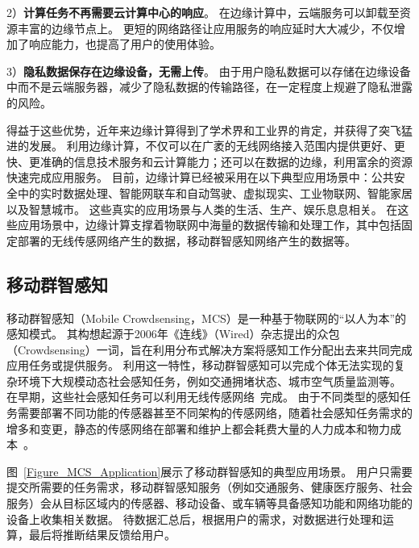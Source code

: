 2）\textbf{计算任务不再需要云计算中心的响应}。
在边缘计算中，云端服务可以卸载至资源丰富的边缘节点上。
更短的网络路径让应用服务的响应延时大大减少，不仅增加了响应能力，也提高了用户的使用体验。

3）\textbf{隐私数据保存在边缘设备，无需上传}。
由于用户隐私数据可以存储在边缘设备中而不是云端服务器，减少了隐私数据的传输路径，在一定程度上规避了隐私泄露的风险。

得益于这些优势，近年来边缘计算得到了学术界和工业界的肯定，并获得了突飞猛进的发展。
利用边缘计算，不仅可以在广袤的无线网络接入范围内提供更好、更快、更准确的信息技术服务和云计算能力；还可以在数据的边缘，利用富余的资源快速完成应用服务。
目前，边缘计算已经被采用在以下典型应用场景中：公共安全中的实时数据处理、智能网联车和自动驾驶、虚拟现实、工业物联网、智能家居以及智慧城市。
这些真实的应用场景与人类的生活、生产、娱乐息息相关。
在这些应用场景中，边缘计算支撑着物联网中海量的数据传输和处理工作，其中包括固定部署的无线传感网络产生的数据，移动群智感知网络产生的数据等。




\subsection{移动群智感知}


移动群智感知（Mobile Crowdsensing，MCS）是一种基于物联网的“以人为本”的感知模式。
其构想起源于2006年《连线》（Wired）杂志提出的众包（Crowdsensing）一词，旨在利用分布式解决方案将感知工作分配出去来共同完成应用任务或提供服务。
利用这一特性，移动群智感知可以完成个体无法实现的复杂环境下大规模动态社会感知任务，例如交通拥堵状态、城市空气质量监测等。
在早期，这些社会感知任务可以利用无线传感网络~\cite{DBLP:journals/cn/AkyildizSSC02}完成。
由于不同类型的感知任务需要部署不同功能的传感器甚至不同架构的传感网络，随着社会感知任务需求的增多和变更，静态的传感网络在部署和维护上都会耗费大量的人力成本和物力成本~\cite{CNKI/2006/WSNRen}。

图~\ref{Figure_MCS_Application}展示了移动群智感知的典型应用场景。
用户只需要提交所需要的任务需求，移动群智感知服务（例如交通服务、健康医疗服务、社会服务）会从目标区域内的传感器、移动设备、或车辆等具备感知功能和网络功能的设备上收集相关数据。
待数据汇总后，根据用户的需求，对数据进行处理和运算，最后将推断结果反馈给用户。

